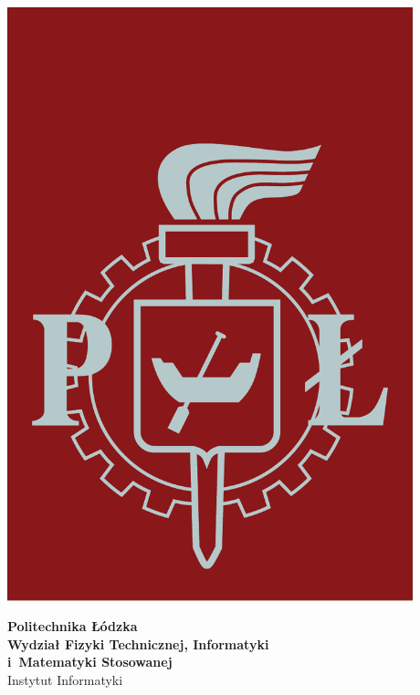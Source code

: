 \begin{titlepage}

\noindent
\begin{minipage}{0.19\textwidth}
\begin{flushleft}
\includegraphics[width=0.88\textwidth]{img/logo}
\end{flushleft}
\end{minipage}
\begin{minipage}[t][][t]{0.81\textwidth}
\begin{flushleft}
\vspace{-2\baselineskip}
\textbf{{\large Politechnika Łódzka}\\}
\vspace{\medskipamount}
\textbf{\large Wydział Fizyki Technicznej, Informatyki\\i~Matematyki Stosowanej}
\vspace{\medskipamount}\\
{\large Instytut Informatyki}\\
\end{flushleft}
\end{minipage}
\vspace{2.5cm}


\end{titlepage}
